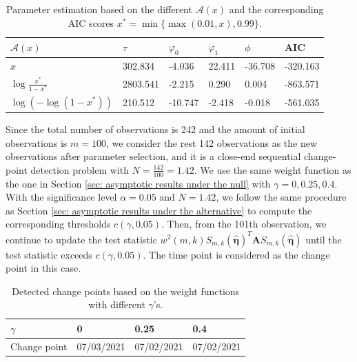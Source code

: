 \documentclass{article}
\theoremstyle{definition}
\begin{document}
\begin{table}[!h]
\centering
\begin{tabular}{l|lllll}
\hline
$\mathcal{A}(x)$         & $\tau$ & $\varphi_0$ & $\varphi_1$ & $\phi$ & AIC \\ \hline
$x$                      &  302.834 & -4.036 & 22.411& -36.708&-320.163\\
$\log \frac{x^*}{1-x^*}$ &    2803.541 &-2.215 & 0.290 & 0.004 &-863.571\\
$\log(-\log(1-x^*))$     &   210.512 & -10.747& -2.418&-0.018 &-561.035 \\ \hline
\end{tabular}
\caption{Parameter estimation based on the different $\mathcal{A}(x)$ and the corresponding AIC scores $x^* = \min\{\max(0.01,x),0.99\}$.}
\label{Table: model comparison}
\end{table}

Since the total number of observations is 242 and the amount of initial observations is $m=100$, we consider the rest 142 observations as the new observations after parameter selection, and it is a close-end sequential change-point detection problem with $N = \frac{142}{100} = 1.42.$ We use the same weight function as the one in Section \ref{sec: asymptotic results under the null} with $\gamma = 0, 0.25, 0.4$. With the significance level $\alpha = 0.05$ and $N = 1.42$, we follow the same procedure as Section \ref{sec: asymptotic results under the alternative} to compute the corresponding thresholds $c(\gamma, 0.05)$. Then, from the 101th observation, we continue to update the test statistic $w^2(m,k)S_{m,k}(\hat{\bm{\eta}})^T\bm{A}S_{m,k}(\hat{\bm{\eta}})$ until the test statistic exceeds $c(\gamma, 0.05)$. The time point is considered as the change point in this case.

\begin{table}[!h]
\centering
\begin{tabular}{l|lll}
\hline
$\gamma$     & 0          & 0.25       & 0.4        \\ \hline
Change point & 07/03/2021 & 07/02/2021 & 07/02/2021 \\ \hline
\end{tabular}
\caption{Detected change points based on the weight functions with different $\gamma$'s.}
\label{table: detected change points}
\end{table}
\end{document}
